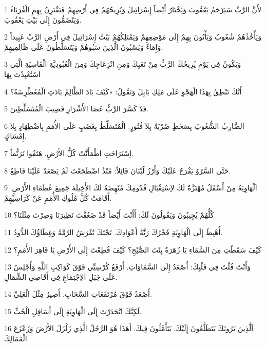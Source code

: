 \par 1 لأَنَّ الرَّبَّ سَيَرْحَمُ يَعْقُوبَ وَيَخْتَارُ أَيْضاً إِسْرَائِيلَ وَيُرِيحُهُمْ فِي أَرْضِهِمْ فَتَقْتَرِنُ بِهِمِ الْغُرَبَاءُ وَيَنْضَمُّونَ إِلَى بَيْتِ يَعْقُوبَ.
\par 2 وَيَأْخُذُهُمْ شُعُوبٌ وَيَأْتُونَ بِهِمْ إِلَى مَوْضِعِهِمْ وَيَمْتَلِكُهُمْ بَيْتُ إِسْرَائِيلَ فِي أَرْضِ الرَّبِّ عَبِيداً وَإِمَاءً وَيَسْبُونَ الَّذِينَ سَبُوهُمْ وَيَتَسَلَّطُونَ عَلَى ظَالِمِيهِمْ.
\par 3 وَيَكُونُ فِي يَوْمٍ يُرِيحُكَ الرَّبُّ مِنْ تَعَبِكَ وَمِنِ انْزِعَاجِكَ وَمِنَ الْعُبُودِيَّةِ الْقَاسِيَةِ الَّتِي اسْتُعْبِدْتَ بِهَا
\par 4 أَنَّكَ تَنْطِقُ بِهَذَا الْهَجْوِ عَلَى مَلِكِ بَابِلَ وَتَقُولُ: «كَيْفَ بَادَ الظَّالِمُ بَادَتِ الْمُغَطْرِسَةُ؟
\par 5 قَدْ كَسَّرَ الرَّبُّ عَصَا الأَشْرَارِ قَضِيبَ الْمُتَسَلِّطِينَ.
\par 6 الضَّارِبُ الشُّعُوبَ بِسَخَطٍ ضَرْبَةً بِلاَ فُتُورٍ. الْمُتَسَلِّطُ بِغَضَبٍ عَلَى الأُمَمِ بِاضْطِهَادٍ بِلاَ إِمْسَاكٍ.
\par 7 اِسْتَرَاحَتِ اطْمَأَنَّتْ كُلُّ الأَرْضِ. هَتَفُوا تَرَنُّماً.
\par 8 حَتَّى السَّرْوُ يَفْرَحُ عَلَيْكَ وَأَرْزُ لُبْنَانَ قَائِلاً: مُنْذُ اضْطَجَعْتَ لَمْ يَصْعَدْ عَلَيْنَا قَاطِعٌ.
\par 9 اَلْهَاوِيَةُ مِنْ أَسْفَلُ مُهْتَزَّةٌ لَكَ لاِسْتِقْبَالِ قُدُومِكَ مُنْهِضَةٌ لَكَ الأَخِيلَةَ جَمِيعَ عُظَمَاءِ الأَرْضِ. أَقَامَتْ كُلَّ مُلُوكِ الأُمَمِ عَنْ كَرَاسِيِّهِمْ.
\par 10 كُلُّهُمْ يُجِيبُونَ وَيَقُولُونَ لَكَ: أَأَنْتَ أَيْضاً قَدْ ضَعُفْتَ نَظِيرَنَا وَصِرْتَ مِثْلَنَا؟
\par 11 أُهْبِطَ إِلَى الْهَاوِيَةِ فَخْرُكَ رَنَّةُ أَعْوَادِكَ. تَحْتَكَ تُفْرَشُ الرِّمَّةُ وَغِطَاؤُكَ الدُّودُ.
\par 12 كَيْفَ سَقَطْتِ مِنَ السَّمَاءِ يَا زُهَرَةُ بِنْتَ الصُّبْحِ؟ كَيْفَ قُطِعْتَ إِلَى الأَرْضِ يَا قَاهِرَ الأُمَمِ؟
\par 13 وَأَنْتَ قُلْتَ فِي قَلْبِكَ: أَصْعَدُ إِلَى السَّمَاوَاتِ. أَرْفَعُ كُرْسِيِّي فَوْقَ كَوَاكِبِ اللَّهِ وَأَجْلِسُ عَلَى جَبَلِ الاِجْتِمَاعِ فِي أَقَاصِي الشِّمَالِ.
\par 14 أَصْعَدُ فَوْقَ مُرْتَفَعَاتِ السَّحَابِ. أَصِيرُ مِثْلَ الْعَلِيِّ.
\par 15 لَكِنَّكَ انْحَدَرْتَ إِلَى الْهَاوِيَةِ إِلَى أَسَافِلِ الْجُبِّ.
\par 16 اَلَّذِينَ يَرُونَكَ يَتَطَلَّعُونَ إِلَيْكَ. يَتَأَمَّلُونَ فِيكَ. أَهَذَا هُوَ الرَّجُلُ الَّذِي زَلْزَلَ الأَرْضَ وَزَعْزَعَ الْمَمَالِكَ
